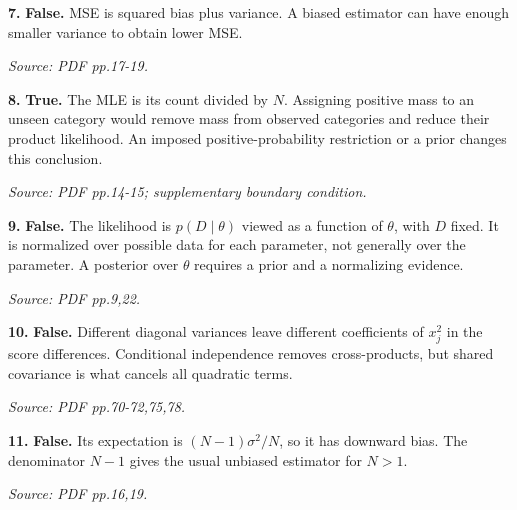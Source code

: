 \documentclass[11pt,a4paper]{article}
\begin{document}
\par\noindent\begin{minipage}{\linewidth}
\textbf{7.} \textbf{False.} MSE is squared bias plus variance. A biased estimator can have enough smaller variance to obtain lower MSE.

{\footnotesize\textit{Source: PDF pp.17-19.}}
\end{minipage}\par\vspace{3mm}
\par\noindent\begin{minipage}{\linewidth}
\textbf{8.} \textbf{True.} The MLE is its count divided by \(N\). Assigning positive mass to an unseen category would remove mass from observed categories and reduce their product likelihood. An imposed positive-probability restriction or a prior changes this conclusion.

{\footnotesize\textit{Source: PDF pp.14-15; supplementary boundary condition.}}
\end{minipage}\par\vspace{3mm}
\par\noindent\begin{minipage}{\linewidth}
\textbf{9.} \textbf{False.} The likelihood is \(p(D\mid\theta)\) viewed as a function of \(\theta\), with \(D\) fixed. It is normalized over possible data for each parameter, not generally over the parameter. A posterior over \(\theta\) requires a prior and a normalizing evidence.

{\footnotesize\textit{Source: PDF pp.9,22.}}
\end{minipage}\par\vspace{3mm}
\par\noindent\begin{minipage}{\linewidth}
\textbf{10.} \textbf{False.} Different diagonal variances leave different coefficients of \(x_j^2\) in the score differences. Conditional independence removes cross-products, but shared covariance is what cancels all quadratic terms.

{\footnotesize\textit{Source: PDF pp.70-72,75,78.}}
\end{minipage}\par\vspace{3mm}
\par\noindent\begin{minipage}{\linewidth}
\textbf{11.} \textbf{False.} Its expectation is \((N-1)\sigma^2/N\), so it has downward bias. The denominator \(N-1\) gives the usual unbiased estimator for \(N>1\).

{\footnotesize\textit{Source: PDF pp.16,19.}}
\end{minipage}\par\vspace{3mm}
\end{document}
